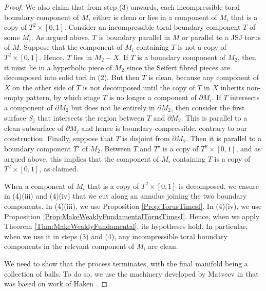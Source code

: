 \documentclass[oneside]{amsart}
\numberwithin{equation}{section}
\theoremstyle{plain}
\theoremstyle{definition}
\begin{document}
\begin{proof}
We also claim that from step (3) onwards, each incompressible toral boundary component of $M_i$ either is clean or lies in a component of $M_i$ that is a copy of $T^2 \times [0,1]$. Consider an incompressible toral boundary component $T$ of some $M_i$. As argued above, $T$ is boundary parallel in $M$ or parallel to a JSJ torus of $M$. Suppose that the component of $M_i$ containing $T$ is not a copy of $T^2 \times [0,1]$. Hence, $T$ lies in $M_2 - X$. If $T$ is a boundary component of $M_2$, then it must lie in a hyperbolic piece of $M_2$ since the Seifert fibred pieces are decomposed into solid tori in (2). But then $T$ is clean, because any component of $X$ on the other side of $T$ is not decomposed until the copy of $T$ in $X$ inherits non-empty pattern, by which stage $T$ is no longer a component of $\partial M_i$. If $T$ intersects a component of $\partial M_2$ but does not lie entirely in $\partial M_2$, then consider the first surface $S_j$ that intersects the region between $T$ and $\partial M_2$. This is parallel to a clean subsurface of $\partial M_j$ and hence is boundary-compressible, contrary to our construction. Finally, suppose that $T$ is disjoint from $\partial M_2$. Then it is parallel to a boundary component $T'$ of $M_2$. Between $T$ and $T'$ is a copy of $T^2 \times [0,1]$, and as argued above, this implies that the component of $M_i$ containing $T$ is a copy of $T^2 \times [0,1]$, as claimed.

When a component of $M_i$ that is a copy of $T^2 \times [0,1]$ is decomposed, we ensure in (4)(iii) and (4)(iv) that we cut along an annulus joining the two boundary components. In (4)(iii), we use Proposition \ref{Prop:TorusTimesI}. In (4)(iv), we use Proposition \ref{Prop:MakeWeaklyFundamentalTorusTimesI}.
Hence, when we apply Theorem \ref{Thm:MakeWeaklyFundamental}, its hypotheses hold. In particular, when we use it in steps (3) and (4), any incompressible toral boundary components in the relevant component of $M_i$ are clean.

We need to show that the process terminates, with the final manifold being a collection of balls. To do so, we use the machinery developed by Matveev in \cite{Matveev} that was based on work of Haken \cite{Haken}.


\end{proof}
\end{document}
